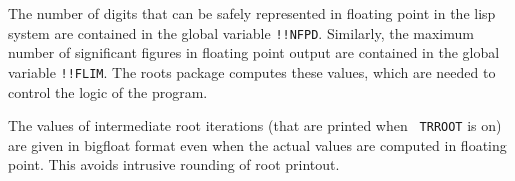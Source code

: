 The number of digits that can be safely represented in floating point in
the lisp system are contained in the global variable {\tt !!NFPD}.
Similarly, the maximum number of significant figures in floating point
output are contained in the global variable {\tt !!FLIM}.  The roots
package computes these values, which are needed to control the logic of
the program.  

The values of intermediate root iterations (that are printed when {\tt
TRROOT} is on) are given in bigfloat format even when the actual values
are computed in floating point.  This avoids intrusive rounding of root
printout.


